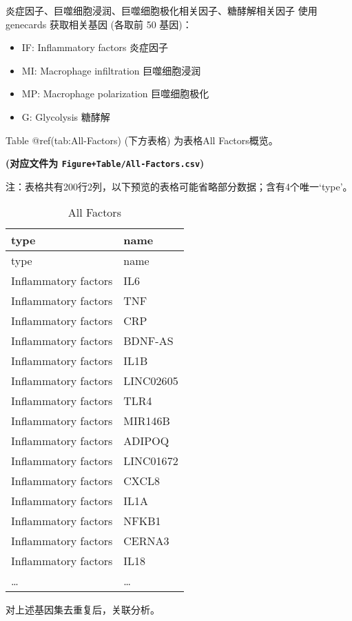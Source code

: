 \documentclass[
  ignorenonframetext,
]{beamer}
\providecommand{\tightlist}{%
  \setlength{\itemsep}{0pt}\setlength{\parskip}{0pt}}
\begin{document}
\begin{frame}[fragile]{炎症因子、巨噬细胞浸润、巨噬细胞极化相关因子、糖酵解相关因子}
\protect\hypertarget{ux708eux75c7ux56e0ux5b50ux5de8ux566cux7ec6ux80deux6d78ux6da6ux5de8ux566cux7ec6ux80deux6781ux5316ux76f8ux5173ux56e0ux5b50ux7cd6ux9175ux89e3ux76f8ux5173ux56e0ux5b50}{}
使用 genecards 获取相关基因 (各取前 50 基因)：

\begin{itemize}
\tightlist
\item
  IF: Inflammatory factors 炎症因子
\item
  MI: Macrophage infiltration 巨噬细胞浸润
\item
  MP: Macrophage polarization 巨噬细胞极化
\item
  G: Glycolysis 糖酵解
\end{itemize}

Table @ref(tab:All-Factors) (下方表格) 为表格All Factors概览。

\textbf{(对应文件为 \texttt{Figure+Table/All-Factors.csv})}

\begin{center}\begin{tcolorbox}[colback=gray!10, colframe=gray!50, width=0.9\linewidth, arc=1mm, boxrule=0.5pt]注：表格共有200行2列，以下预览的表格可能省略部分数据；含有4个唯一`type'。
\end{tcolorbox}
\end{center}

\begin{longtable}[]{@{}ll@{}}
\caption{All Factors}\tabularnewline
\toprule
type & name\tabularnewline
\midrule
\endfirsthead
\toprule
type & name\tabularnewline
\midrule
\endhead
Inflammatory factors & IL6\tabularnewline
Inflammatory factors & TNF\tabularnewline
Inflammatory factors & CRP\tabularnewline
Inflammatory factors & BDNF-AS\tabularnewline
Inflammatory factors & IL1B\tabularnewline
Inflammatory factors & LINC02605\tabularnewline
Inflammatory factors & TLR4\tabularnewline
Inflammatory factors & MIR146B\tabularnewline
Inflammatory factors & ADIPOQ\tabularnewline
Inflammatory factors & LINC01672\tabularnewline
Inflammatory factors & CXCL8\tabularnewline
Inflammatory factors & IL1A\tabularnewline
Inflammatory factors & NFKB1\tabularnewline
Inflammatory factors & CERNA3\tabularnewline
Inflammatory factors & IL18\tabularnewline
\ldots{} & \ldots{}\tabularnewline
\bottomrule
\end{longtable}

对上述基因集去重复后，关联分析。
\end{frame}
\end{document}
